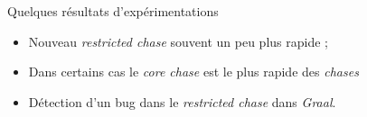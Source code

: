 \begin{frame}{Quelques résultats d'expérimentations}
    \begin{itemize}
        \item Nouveau \textit{restricted chase} souvent un peu plus rapide ;
        \item<2-> Dans certains cas le \textit{core chase} est le plus rapide des \textit{chases}
        \item<3-> Détection d'un bug dans le \textit{restricted chase} dans \textit{Graal}.
    \end{itemize}
    \begin{center}
\end{center}
\end{frame}

